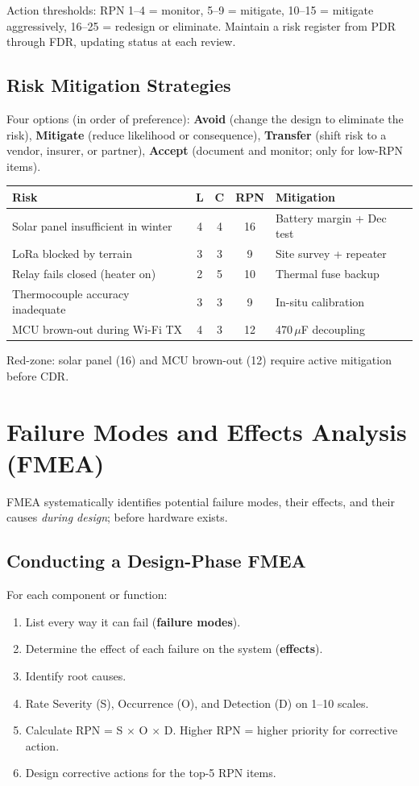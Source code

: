 Action thresholds: RPN 1--4 = monitor, 5--9 = mitigate, 10--15 = mitigate aggressively, 16--25 = redesign or eliminate. Maintain a risk register from PDR through FDR, updating status at each review.

\subsection{Risk Mitigation Strategies}
Four options (in order of preference): \textbf{Avoid} (change the design to eliminate the risk), \textbf{Mitigate} (reduce likelihood or consequence), \textbf{Transfer} (shift risk to a vendor, insurer, or partner), \textbf{Accept} (document and monitor; only for low-RPN items).


\begin{greenshieldbox}
\small
\begin{tabularx}{\linewidth}{X c c c X}
\toprule
\textbf{Risk} & \textbf{L} & \textbf{C} & \textbf{RPN} & \textbf{Mitigation} \\
\midrule
Solar panel insufficient in winter & 4 & 4 & 16 & Battery margin + Dec test \\
LoRa blocked by terrain & 3 & 3 & 9 & Site survey + repeater \\
Relay fails closed (heater on) & 2 & 5 & 10 & Thermal fuse backup \\
Thermocouple accuracy inadequate & 3 & 3 & 9 & In-situ calibration \\
MCU brown-out\index{brown-out} during Wi-Fi TX & 4 & 3 & 12 & 470\,$\mu$F decoupling \\
\bottomrule
\end{tabularx}
Red-zone: solar panel (16) and MCU brown-out (12) require active mitigation before CDR.
\end{greenshieldbox}

\section{Failure Modes and Effects Analysis (FMEA)}
FMEA systematically identifies potential failure modes, their effects, and their causes \emph{during design}; before hardware exists.

\subsection{Conducting a Design-Phase FMEA}
For each component or function:
\begin{enumerate}[nosep,leftmargin=1.5em]
\item List every way it can fail (\textbf{failure modes}).
\item Determine the effect of each failure on the system (\textbf{effects}).
\item Identify root causes.
\item Rate Severity (S), Occurrence (O), and Detection (D) on 1--10 scales.
\item Calculate RPN = S $\times$ O $\times$ D. Higher RPN = higher priority for corrective action.
\item Design corrective actions for the top-5 RPN items.
\end{enumerate}

